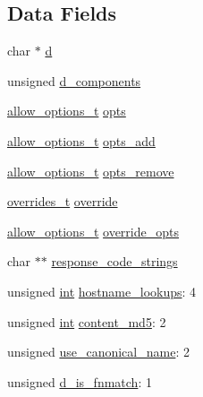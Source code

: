 \subsection*{Data Fields}
\begin{DoxyCompactItemize}
\item 
char $\ast$ \hyperlink{structcore__dir__config_a21a73235f4a793d4c96c1e5ba5342e58}{d}
\item 
unsigned \hyperlink{structcore__dir__config_ac59be2f20ea007744653dc26a629bfe3}{d\+\_\+components}
\item 
\hyperlink{group__APACHE__CORE__HTTPD_ga690d446d4d1bb68e9b9ad82e1de6faa2}{allow\+\_\+options\+\_\+t} \hyperlink{structcore__dir__config_a040a02db82f60403e572e0b42f67ed4a}{opts}
\item 
\hyperlink{group__APACHE__CORE__HTTPD_ga690d446d4d1bb68e9b9ad82e1de6faa2}{allow\+\_\+options\+\_\+t} \hyperlink{structcore__dir__config_a7b6c01d92223dd4e009baded4e6cd4cb}{opts\+\_\+add}
\item 
\hyperlink{group__APACHE__CORE__HTTPD_ga690d446d4d1bb68e9b9ad82e1de6faa2}{allow\+\_\+options\+\_\+t} \hyperlink{structcore__dir__config_af04c3013704ea3938b340c6cff39c35c}{opts\+\_\+remove}
\item 
\hyperlink{group__APACHE__CORE__HTTPD_ga4c9d0f694a232ecee18b53bfe18a8ce6}{overrides\+\_\+t} \hyperlink{structcore__dir__config_aedb0318a344bed233d122bd5d4126a88}{override}
\item 
\hyperlink{group__APACHE__CORE__HTTPD_ga690d446d4d1bb68e9b9ad82e1de6faa2}{allow\+\_\+options\+\_\+t} \hyperlink{structcore__dir__config_a51fd85f667c0192b876007417b4461f1}{override\+\_\+opts}
\item 
char $\ast$$\ast$ \hyperlink{structcore__dir__config_a65e930e6055967b5ef44484b7f001a0f}{response\+\_\+code\+\_\+strings}
\item 
unsigned \hyperlink{pcre_8txt_a42dfa4ff673c82d8efe7144098fbc198}{int} \hyperlink{structcore__dir__config_a718a855c9e5027746ae5508508a65a03}{hostname\+\_\+lookups}\+: 4
\item 
unsigned \hyperlink{pcre_8txt_a42dfa4ff673c82d8efe7144098fbc198}{int} \hyperlink{structcore__dir__config_add9c6a23997042094ae448da0520cdc1}{content\+\_\+md5}\+: 2
\item 
unsigned \hyperlink{structcore__dir__config_ab1d3f64a79944395fb93b056d42db39c}{use\+\_\+canonical\+\_\+name}\+: 2
\item 
unsigned \hyperlink{structcore__dir__config_a08c5cc2c2eb487360ecd06db5fc52732}{d\+\_\+is\+\_\+fnmatch}\+: 1
\item 
$$
\end{DoxyCompactItemize}
